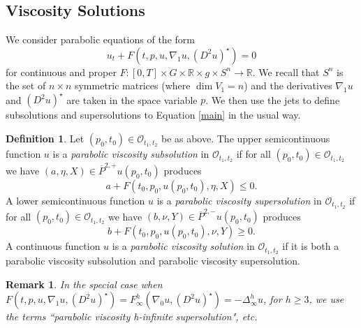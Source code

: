 \documentclass[12pt]{amsart}
\newtheorem{remark}[thm]{Remark}
\theoremstyle{definition}
\newtheorem{definition}{Definition}
\theoremstyle{remark}
\numberwithin{equation}{section}
\begin{document}
\subsection{Viscosity Solutions}
We consider parabolic equations of the form 
\begin{equation}\label{main}
u_t+F(t,p,u,\nabla_1 u,(D^2u)^{\star})=0
\end{equation}
for continuous and proper $F:[0,T]\times G \times \mathbb{R} \times g \times S^{n} \to \mathbb{R}$.  \cite{CIL:UGTVS}
We recall that $S^{n}$ is the set of $n \times n$ symmetric matrices (where $\dim V_1=n$) and the derivatives  $\nabla_1 u$ and $(D^2u)^{\star}$ are taken in the space variable $p$.  
We then use the jets to define subsolutions and supersolutions to Equation \eqref{main} in the usual way.
\begin{definition}\label{1}
Let $(p_0,t_0)\in \mathcal{O}_{t_1,t_2}$ be as above.  The upper semicontinuous function $u$ is a \emph{parabolic viscosity subsolution} in $\mathcal{O}_{t_1,t_2}$ if for all $(p_0,t_0) \in \mathcal{O}_{t_1,t_2}$ we have $(a,\eta,X) \in \overline{P}^{2,+}u(p_0,t_0)$ produces 
$$a+F(t_0,p_0,u(p_0,t_0),\eta,X)\leq 0.$$
A lower semicontinuous function $u$ is a \emph{parabolic viscosity supersolution} in $\mathcal{O}_{t_1,t_2}$ if for all $(p_0,t_0) \in \mathcal{O}_{t_1,t_2}$ we have $(b,\nu,Y) \in \overline{P}^{2,-}u(p_0,t_0)$ produces 
$$b+F(t_0,p_0,u(p_0,t_0),\nu,Y)\geq 0.$$
A continuous function $u$ is a \emph{parabolic viscosity solution} in $\mathcal{O}_{t_1,t_2}$ if it is both a parabolic viscosity subsolution and parabolic viscosity supersolution.
\end{definition}
\begin{remark}
In the special case when $F(t,p,u,\nabla_1 u,(D^2u)^{\star})=F^h_\infty(\nabla_0 u,(D^2u)^{\star})=-\Delta^h_{\infty}u$, for $h\geq 3$, we use the terms ``parabolic viscosity h-infinite supersolution", etc. 
\end{remark}
\end{document}
